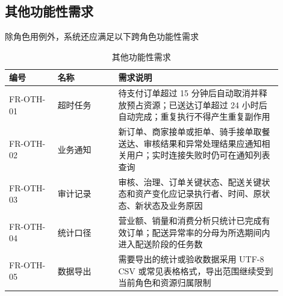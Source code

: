 \subsection{其他功能性需求}

除角色用例外，系统还应满足以下跨角色功能性需求

\begin{longtable}{|L{0.16\linewidth}|L{0.20\linewidth}|L{0.54\linewidth}|}
\caption{其他功能性需求}\label{tab:other-functional}\\ \hline
\textbf{编号} & \textbf{名称} & \textbf{需求说明} \\ \hline
FR-OTH-01 & 超时任务 & 待支付订单超过 15 分钟后自动取消并释放预占资源；已送达订单超过 24 小时后自动完成；重复执行不得产生重复副作用 \\ \hline
FR-OTH-02 & 业务通知 & 新订单、商家接单或拒单、骑手接单取餐送达、审核结果和异常处理结果应通知相关用户；实时连接失败时仍可在通知列表查询 \\ \hline
FR-OTH-03 & 审计记录 & 审核、治理、订单关键状态、配送关键状态和资产变化应记录执行者、时间、原状态、新状态及业务原因 \\ \hline
FR-OTH-04 & 统计口径 & 营业额、销量和消费分析只统计已完成有效订单；配送异常率的分母为所选期间内进入配送阶段的任务数 \\ \hline
FR-OTH-05 & 数据导出 & 需要导出的统计或验收数据采用 UTF-8 CSV 或常见表格格式，导出范围继续受到当前角色和资源归属限制 \\ \hline
\end{longtable}
